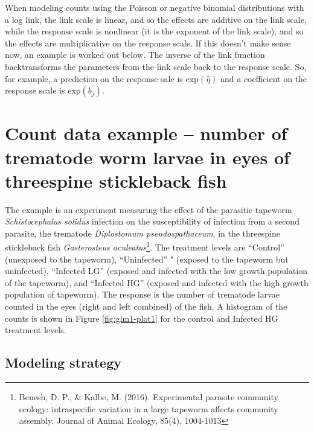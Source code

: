 \documentclass[]{book}
\let\rmarkdownfootnote\footnote%
\def\footnote{\protect\rmarkdownfootnote}
\begin{document}
When modeling counts using the Poisson or negative binomial distributions with a log link, the link scale is linear, and so the effects are additive on the link scale, while the response scale is nonlinear (it is the exponent of the link scale), and so the effects are multiplicative on the response scale. If this doesn't make sense now, an example is worked out below. The inverse of the link function backtransforms the parameters from the link scale back to the response scale. So, for example, a prediction on the response sale is \(\mathrm{exp}(\hat{\eta})\) and a coefficient on the response scale is \(\mathrm{exp}(b_j)\).

\hypertarget{count-data-example-number-of-trematode-worm-larvae-in-eyes-of-threespine-stickleback-fish}{%
\section{Count data example -- number of trematode worm larvae in eyes of threespine stickleback fish}\label{count-data-example-number-of-trematode-worm-larvae-in-eyes-of-threespine-stickleback-fish}}

The example is an experiment measuring the effect of the parasitic tapeworm \emph{Schistocephalus solidus} infection on the susceptibility of infection from a second parasite, the trematode \emph{Diplostomum pseudospathaceum}, in the threespine stickleback fish \emph{Gasterosteus aculeatus}\footnote{Benesh, D. P., \& Kalbe, M. (2016). Experimental parasite community ecology: intraspecific variation in a large tapeworm affects community assembly. Journal of Animal Ecology, 85(4), 1004-1013}. The treatment levels are ``Control'' (unexposed to the tapeworm), ``Uninfected'' " (exposed to the tapeworm but uninfected), ``Infected LG'' (exposed and infected with the low growth population of the tapeworm), and ``Infected HG'' (exposed and infected with the high growth population of tapeworm). The response is the number of trematode larvae counted in the eyes (right and left combined) of the fish. A histogram of the counts is shown in Figure \ref{fig:glm1-plot1} for the control and Infected HG treatment levels.

\hypertarget{modeling-strategy-1}{%
\subsection{Modeling strategy}\label{modeling-strategy-1}}
\end{document}
